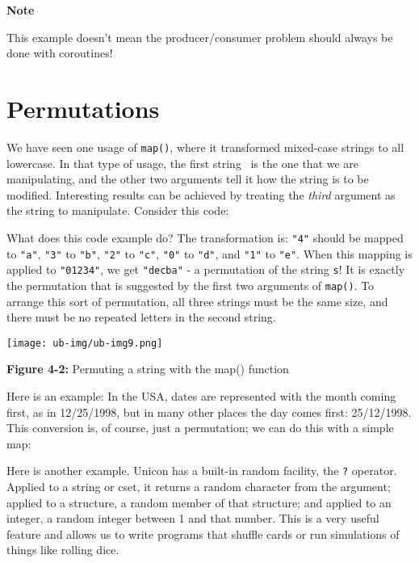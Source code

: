 {\sffamily\bfseries
Note}

{\sffamily
This example doesn't mean the producer/consumer problem
should always be done with coroutines!}

\section{Permutations}

We have seen one usage of
\texttt{map()}, where it transformed mixed-case strings to
all lowercase. In that type of usage, the first string \ is the one
that we are manipulating, and the other two arguments tell it how the
string is to be modified. Interesting results can be achieved by
treating the \textit{third} argument as the string to manipulate.
Consider this code:


What does this code example do? The transformation is:
\texttt{"4"} should be mapped to
\texttt{"a"},
\texttt{"3"} to
\texttt{"b"},
\texttt{"2"} to
\texttt{"c"},
\texttt{"0"} to
\texttt{"d"}, and
\texttt{"1"} to
\texttt{"e"}. When this mapping is applied
to \texttt{"01234"}, we get
\texttt{"decba"} - a permutation of the
string \texttt{s}! It is exactly the permutation that is suggested by
the first two arguments of \texttt{map()}. To arrange this sort of
permutation, all three strings must be the same size, and there must be
no repeated letters in the second string.


\begin{center}
\texttt{[image: ub-img/ub-img9.png]}
\end{center}
{\sffamily\bfseries Figure 4-2:}
{\sffamily Permuting a string with the map() function}

\bigskip

Here is an example: In the USA, dates are represented with the month
coming first, as in 12/25/1998, but in many other places the day comes
first: 25/12/1998. This conversion is, of course, just a permutation;
we can do this with a simple map:


Here is another example. Unicon has a built-in random facility, the
\texttt{?} operator. Applied to a string or cset, it returns a random
character from the argument; applied to a structure, a random member of
that structure; and applied to an integer, a random integer between 1
and that number. This is a very useful feature and allows us to write
programs that shuffle cards or run simulations of things like rolling
dice.

